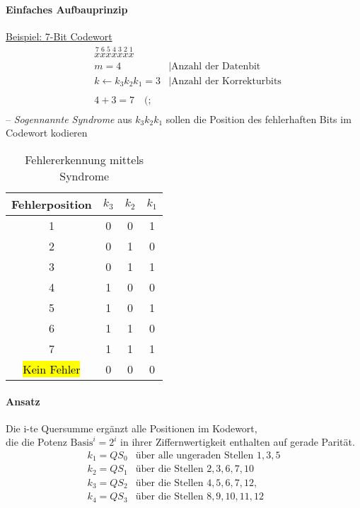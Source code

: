 \documentclass[a4paper]{scrartcl}
\begin{document}
					\paragraph{Einfaches Aufbauprinzip}
					\ul{Beispiel: 7-Bit Codewort}  \\
					 \begin{align*}
					 	 &\overset{7}{x} \overset{6}{x} \overset{5}{x} \overset{4}{x} \overset{3}{x} \overset{2}{x} \overset{1}{x}\\
					 	&m = 4 &| \text{Anzahl der Datenbit}\\
					 	&k \gets k_3 k_2 k_1 = 3 &| \text{Anzahl der Korrekturbits} \\
					 	\\
					 	&4 + 3 = 7 \quad (;\\
					 \end{align*}
					 -- \emph{Sogennannte Syndrome} aus \( k_3 k_2 k_1 \) sollen die Position des fehlerhaften Bits im Codewort kodieren\\ 
					
					\begin{table}[h]
						\centering
						\begin{tabular}{c | c c c }
							Fehlerposition	&\(k_3\) &\(k_2\) & \(k_1\) \\ \hline
							1& 0 & 0 &1\\
							2 &0&1&0\\
							3 &0&1&1\\
							4 &1&0&0\\
							5 &1&0&1\\
							6 &1&1&0\\
							7 &1&1&1\\
							\hl{Kein Fehler}&0&0&0
						\end{tabular}
						\caption{Fehlererkennung mittels Syndrome}
					\end{table}
					
					\paragraph{Ansatz}
						Die i-te Quersumme ergänzt alle Positionen im Kodewort,\\
						die die Potenz \(\text{Basis}^i = 2^i  \) in ihrer Ziffernwertigkeit enthalten auf gerade Parität.\\
						\begin{align*}
							k_1 = QS_0 &\text{über alle ungeraden Stellen } 1,3,5 \\
							k_2 = QS_1 &\text{über die Stellen } 2,3,6,7, 10 \\
							k_3 = QS_2 &\text{über die Stellen } 4, 5, 6, 7, 12,  \\
							k_4 = QS_3 &\text{über die Stellen } 8, 9, 10, 11, 12 \\
						\end{align*}
						
\end{document}
